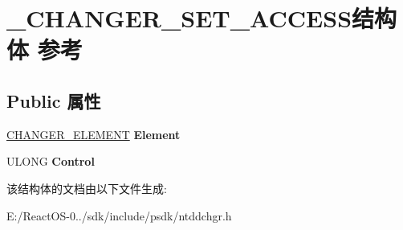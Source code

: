 \hypertarget{struct___c_h_a_n_g_e_r___s_e_t___a_c_c_e_s_s}{}\section{\+\_\+\+C\+H\+A\+N\+G\+E\+R\+\_\+\+S\+E\+T\+\_\+\+A\+C\+C\+E\+S\+S结构体 参考}
\label{struct___c_h_a_n_g_e_r___s_e_t___a_c_c_e_s_s}
\subsection*{Public 属性}
\begin{DoxyCompactItemize}
\item 
\mbox{\label{struct___c_h_a_n_g_e_r___s_e_t___a_c_c_e_s_s_a916ce5c11f2ab796de431a712c94bd7c}} 
\hyperlink{struct___c_h_a_n_g_e_r___e_l_e_m_e_n_t}{C\+H\+A\+N\+G\+E\+R\+\_\+\+E\+L\+E\+M\+E\+NT} {\bfseries Element}
\item 
\mbox{\label{struct___c_h_a_n_g_e_r___s_e_t___a_c_c_e_s_s_aef2183f1c5805789f0d66ee84bf5e5f2}} 
U\+L\+O\+NG {\bfseries Control}
\end{DoxyCompactItemize}


该结构体的文档由以下文件生成\+:\begin{DoxyCompactItemize}
\item 
E\+:/\+React\+O\+S-\/0../sdk/include/psdk/ntddchgr.\+h\end{DoxyCompactItemize}
